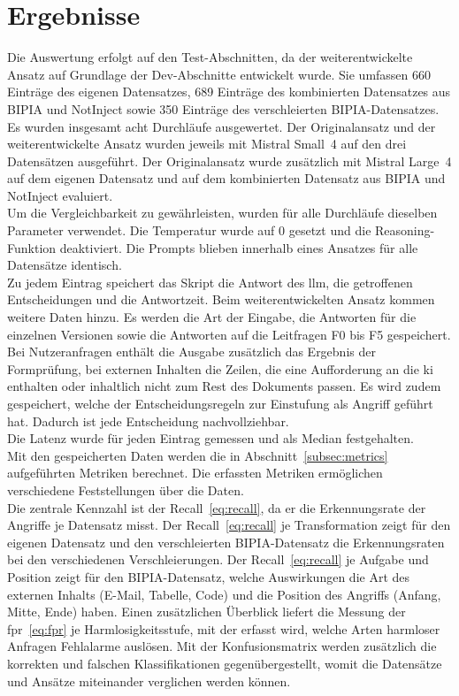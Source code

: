 \section{Ergebnisse}\label{sec:results}

Die Auswertung erfolgt auf den Test-Abschnitten, da der weiterentwickelte Ansatz auf Grundlage der Dev-Abschnitte entwickelt wurde. Sie umfassen 660 Einträge des 
eigenen Datensatzes, 689 Einträge des kombinierten Datensatzes aus BIPIA und NotInject sowie 350 Einträge des verschleierten BIPIA-Datensatzes. \\
Es wurden insgesamt acht Durchläufe ausgewertet. Der Originalansatz und der weiterentwickelte Ansatz wurden jeweils mit Mistral Small~4 auf den drei Datensätzen 
ausgeführt. Der Originalansatz wurde zusätzlich mit Mistral Large~4 auf dem eigenen Datensatz und auf dem kombinierten Datensatz aus BIPIA und NotInject evaluiert. \\
Um die Vergleichbarkeit zu gewährleisten, wurden für alle Durchläufe dieselben Parameter verwendet. Die Temperatur wurde auf 0 gesetzt und die 
Reasoning-Funktion deaktiviert. Die Prompts blieben innerhalb eines Ansatzes für alle Datensätze identisch. \\
Zu jedem Eintrag speichert das Skript die Antwort des \ac{llm}, die getroffenen Entscheidungen und die Antwortzeit. Beim weiterentwickelten Ansatz kommen weitere
Daten hinzu. Es werden die Art der Eingabe, die Antworten für die einzelnen Versionen sowie die Antworten auf die Leitfragen F0 bis F5 gespeichert.
Bei Nutzeranfragen enthält die Ausgabe zusätzlich das Ergebnis der Formprüfung, bei externen Inhalten die Zeilen, die eine Aufforderung an die \ac{ki}
enthalten oder inhaltlich nicht zum Rest des Dokuments passen. Es wird zudem gespeichert, welche der Entscheidungsregeln zur Einstufung
als Angriff geführt hat. Dadurch ist jede Entscheidung nachvollziehbar. \\
Die Latenz wurde für jeden Eintrag gemessen und als Median festgehalten. \\
Mit den gespeicherten Daten werden die in Abschnitt~\ref{subsec:metrics} aufgeführten Metriken berechnet. Die erfassten Metriken ermöglichen verschiedene Feststellungen
über die Daten. \\
Die zentrale Kennzahl ist der Recall~\eqref{eq:recall}, da er die Erkennungsrate der Angriffe je Datensatz misst. Der Recall~\eqref{eq:recall} je Transformation zeigt 
für den eigenen Datensatz und den verschleierten 
BIPIA-Datensatz die Erkennungsraten bei den verschiedenen Verschleierungen. Der Recall~\eqref{eq:recall} je Aufgabe und Position zeigt für den BIPIA-Datensatz, welche Auswirkungen 
die Art des externen Inhalts (E-Mail, Tabelle, Code) und die Position des Angriffs (Anfang, Mitte, Ende) haben. Einen zusätzlichen Überblick liefert die Messung
der \ac{fpr}~\eqref{eq:fpr} je Harmlosigkeitsstufe, mit der erfasst wird, welche Arten harmloser Anfragen Fehlalarme auslösen. Mit der Konfusionsmatrix werden zusätzlich die 
korrekten und falschen Klassifikationen gegenübergestellt, womit die Datensätze und Ansätze miteinander verglichen werden können.

